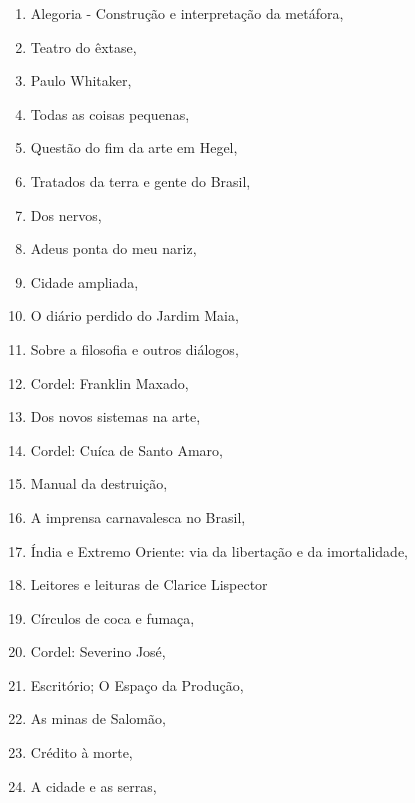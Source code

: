 \begin{multicols}{2}
\begin{enumerate}
\item Alegoria - Construção e interpretação da metáfora, {}
\item Teatro do êxtase, {}
\item Paulo Whitaker, {}
\item Todas as coisas pequenas, {}
\item Questão do fim da arte em Hegel, {}
\item Tratados da terra e gente do Brasil, {}
\item Dos nervos, {}
\item Adeus ponta do meu nariz, {}
\item Cidade ampliada, {}
\item O diário perdido do Jardim Maia, {}
\item Sobre a filosofia e outros diálogos, {}
\item Cordel: Franklin Maxado, {}
\item Dos novos sistemas na arte, {}
\item Cordel: Cuíca de Santo Amaro, {}
\item Manual da destruição, {}
\item A imprensa carnavalesca no Brasil, {}
\item Índia e Extremo Oriente: via da libertação e da imortalidade, {}
\item Leitores e leituras de Clarice Lispector
\item Círculos de coca e fumaça, {}
\item Cordel: Severino José, {}
\item Escritório; O Espaço da Produção, {}
\item As minas de Salomão, {}
\item Crédito à morte, {}
\item A cidade e as serras, {}

\end{enumerate}
\end{multicols}
